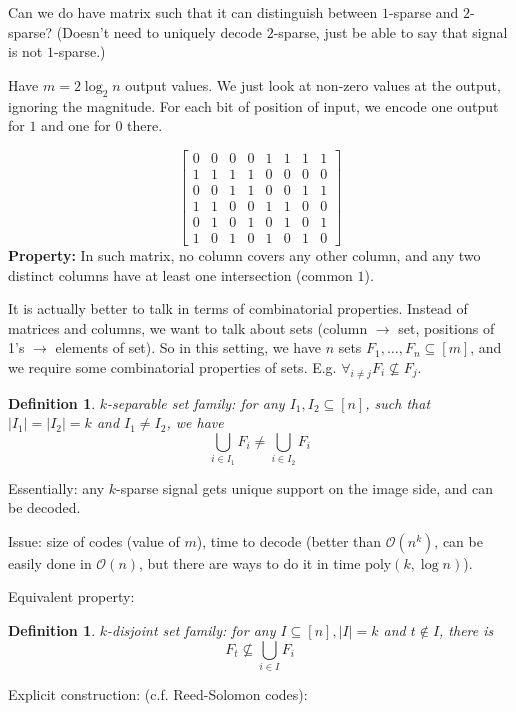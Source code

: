 \documentclass[11pt]{article}
\newtheorem{definition}[theorem]{Definition}
\newcommand{\bigo}{\mathcal{O}}
\begin{document}
Can we do have matrix such that it can distinguish between $1$-sparse and $2$-sparse? (Doesn't need to uniquely decode $2$-sparse, just be able to say that signal is not $1$-sparse.)

Have $m = 2 \log_2 n$ output values. We just look at non-zero values at the output, ignoring the magnitude. For each bit of position of input, we encode one output for $1$ and one for $0$ there.

$$\begin{bmatrix} 0 & 0 & 0 & 0 & 1 & 1 & 1 & 1 \\ 1 & 1 & 1 & 1 &  0 & 0 & 0 & 0 \\  0 & 0 & 1 & 1 & 0 & 0 & 1 & 1 \\ 1 & 1 & 0 & 0 & 1 & 1 & 0 & 0  \\ 0 & 1 & 0 & 1 & 0 & 1 & 0 & 1 \\ 1 & 0 & 1 & 0 & 1 & 0 & 1 & 0 \end{bmatrix}
$$
\textbf{Property:} In such matrix, no column covers any other column, and any two distinct columns have at least one intersection (common $1$).


It is actually better to talk in terms of combinatorial properties. Instead of matrices and columns, we want to talk about sets (column $\to$ set, positions of 1's $\to$ elements of set).
So in this setting, we have $n$ sets $F_1,\ldots,F_n \subseteq [m]$, and we require some combinatorial properties of sets. E.g. $\forall_{i\not=j} F_i \not\subseteq F_j$.

\begin{definition}
$k$-separable set family: for any $I_1,I_2 \subseteq [n]$, such that $|I_1| = |I_2| = k$ and $I_1 \not= I_2$, we have
$$ \bigcup_{i \in I_1} F_i \not= \bigcup_{i \in I_2} F_i$$
\end{definition}

Essentially: any $k$-sparse signal gets unique support on the image side, and can be decoded.

Issue: size of codes (value of $m$), time to decode (better than $\bigo(n^k)$, can be easily done in $\bigo(n)$, but there are ways to do it in time $\textrm{poly}(k,\log n)$).

Equivalent property: 
\begin{definition}
$k$-disjoint set family:
for any $I \subseteq [n], |I| = k$ and $t \not\in I$, there is 
$$F_t \not\subseteq \bigcup_{i \in I} F_i$$
\end{definition}

Explicit construction: (c.f. Reed-Solomon codes):
\end{document}
